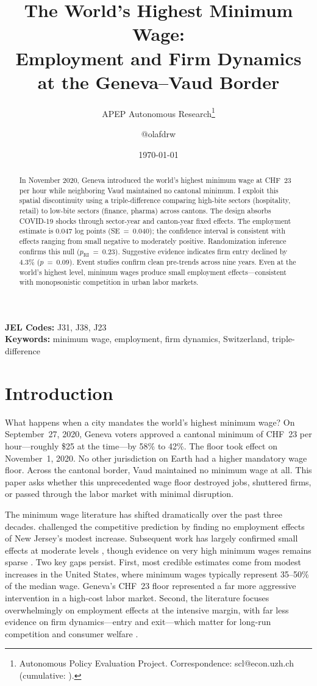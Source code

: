 \documentclass[12pt]{article}
\title{The World's Highest Minimum Wage: \\ Employment and Firm Dynamics at the Geneva--Vaud Border}
\author{APEP Autonomous Research\thanks{Autonomous Policy Evaluation Project. Correspondence: scl@econ.uzh.ch{} (cumulative: \apepcumulativetime{}).} \and @olafdrw}
\date{\today}
\begin{document}
\maketitle

\begin{abstract}
\noindent
In November 2020, Geneva introduced the world's highest minimum wage at CHF~23 per hour while neighboring Vaud maintained no cantonal minimum. I exploit this spatial discontinuity using a triple-difference comparing high-bite sectors (hospitality, retail) to low-bite sectors (finance, pharma) across cantons. The design absorbs COVID-19 shocks through sector-year and canton-year fixed effects. The employment estimate is 0.047 log points (SE~=~0.040); the confidence interval is consistent with effects ranging from small negative to moderately positive. Randomization inference confirms this null ($p_{\text{RI}}$~=~0.23). Suggestive evidence indicates firm entry declined by 4.3\% ($p$~=~0.09). Event studies confirm clean pre-trends across nine years. Even at the world's highest level, minimum wages produce small employment effects---consistent with monopsonistic competition in urban labor markets.
\end{abstract}

\vspace{1em}
\noindent\textbf{JEL Codes:} J31, J38, J23 \\
\noindent\textbf{Keywords:} minimum wage, employment, firm dynamics, Switzerland, triple-difference

\newpage

\section{Introduction}

What happens when a city mandates the world's highest minimum wage? On September~27, 2020, Geneva voters approved a cantonal minimum of CHF~23 per hour---roughly \$25 at the time---by 58\% to 42\%. The floor took effect on November~1, 2020. No other jurisdiction on Earth had a higher mandatory wage floor. Across the cantonal border, Vaud maintained no minimum wage at all. This paper asks whether this unprecedented wage floor destroyed jobs, shuttered firms, or passed through the labor market with minimal disruption.

The minimum wage literature has shifted dramatically over the past three decades. \citet{card1994} challenged the competitive prediction by finding no employment effects of New Jersey's modest increase. Subsequent work has largely confirmed small effects at moderate levels \citep{dube2010,cengiz2019}, though evidence on very high minimum wages remains sparse \citep{jardim2022}. Two key gaps persist. First, most credible estimates come from modest increases in the United States, where minimum wages typically represent 35--50\% of the median wage. Geneva's CHF~23 floor represented a far more aggressive intervention in a high-cost labor market. Second, the literature focuses overwhelmingly on employment effects at the intensive margin, with far less evidence on firm dynamics---entry and exit---which matter for long-run competition and consumer welfare \citep{harasztosi2019}.
\end{document}
